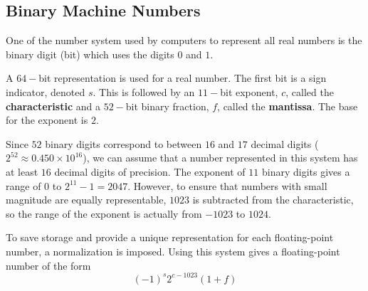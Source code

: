 \subsection*{Binary Machine Numbers}
One of the number system used by computers to represent all real numbers is the binary digit (bit) which uses the digits $0$ and $1$. 

A $64-$bit representation is used for a real number. The first bit is a sign indicator, denoted $s$. This is followed by an $11-$bit exponent, $c$, called the {\bf characteristic} and a $52-$bit binary fraction, $f$, called the {\bf mantissa}. The base for the exponent is $2$.

Since $52$ binary digits correspond to between $16$ and $17$ decimal digits ($2^{52}\approx0.450\times10^{16}$), we can assume  that a number represented in this system has at least $16$ decimal digits of precision. The  exponent of $11$ binary digits gives a range of $0$ to $2^{11}−1 = 2047$. However, to ensure that numbers with small magnitude are equally representable, $1023$ is subtracted from the characteristic, so the range of the exponent is actually from $-1023$ to $1024$.

To save storage and provide a unique representation for each floating-point number, a  normalization is imposed. Using this system gives a floating-point number of the form
\[(-1)^{s}2^{c-1023} (1+f)\]


